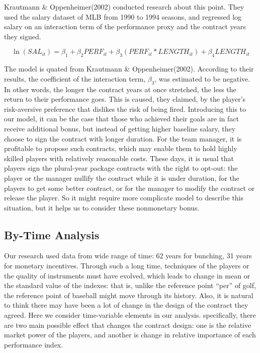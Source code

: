 \documentclass[dvipdfmx, 12pt]{article}
\begin{document}
Krautmann \& Oppenheimer(2002) conducted research about this point. They used the salary dataset of MLB from 1990 to 1994 seasons, and regressed log salary on an interaction term of the performance proxy and the contract years they signed.

\[
\ln(SAL_{it}) = \beta_1 + \beta_2 PERF_{it} + \beta_3 (PERF_{it} * LENGTH_{it})+ \beta_4 LENGTH_{it}
\]

The model is quated from Krautmann \& Oppenheimer(2002). According to their results, the coefficient of the interaction term, $\beta_3$, was estimated to be negative. In other words, the longer the contract years at once stretched, the less the return to their performance goes. This is caused, they claimed, by the player's risk-aversive preference that dislikes the risk of being fired. Introducing this to our model, it can be the case that those who achieved their goals are in fact receive additional bonus, but instead of getting higher baseline salary, they choose to sign the contract with longer duration. For the team manager, it is profitable to propose such contracts, which may enable them to hold highly skilled players with relatively reasonable costs. These days, it is usual that players sign the plural-year package contracts with the right to opt-out: the player or the manager nullify the contract while it is under duration, for the players to get some better contract, or for the manager to modify the contract or release the player. So it might require more complicate model to describe this situation, but it helps us to consider these nonmonetary bonus.

\subsection{By-Time Analysis}

Our research used data from wide range of time: 62 years for bunching, 31 years for monetary incentives. Through such a long time, techniques of the players or the quality of instruments must have evolved, which leads to change in mean or the standard value of the indexes: that is, unlike the reference point ``per'' of golf, the reference point of baseball might move through its history. Also, it is natural to think there may have been a lot of change in the design of the contract they agreed. Here we consider time-variable elements in our analysis. specifically, there are two main possible effect that changes the contract design: one is the relative market power of the players, and another is change in relative importance of each performance index.
\end{document}
